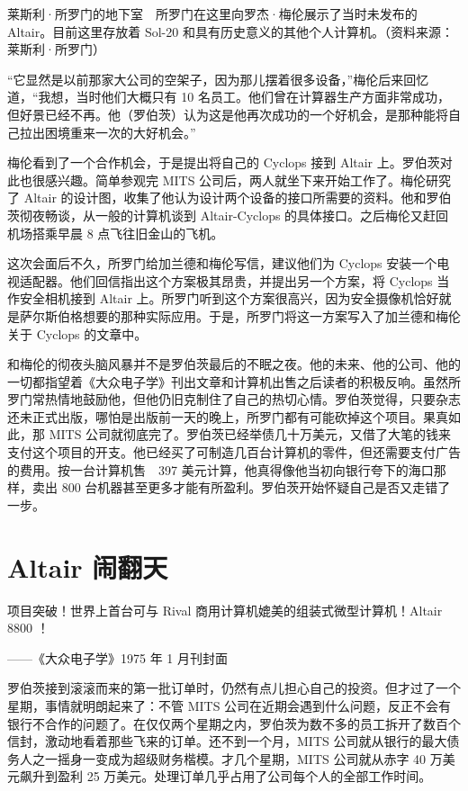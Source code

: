 \documentclass[12pt,UTF8]{ctexbook}
\begin{document}
莱斯利·所罗门的地下室　所罗门在这里向罗杰·梅伦展示了当时未发布的 Altair。目前这里存放着 Sol-20 和具有历史意义的其他个人计算机。（资料来源：莱斯利·所罗门）

“它显然是以前那家大公司的空架子，因为那儿摆着很多设备，”梅伦后来回忆道，“我想，当时他们大概只有 10 名员工。他们曾在计算器生产方面非常成功，但好景已经不再。他（罗伯茨）认为这是他再次成功的一个好机会，是那种能将自己拉出困境重来一次的大好机会。”

梅伦看到了一个合作机会，于是提出将自己的 Cyclops 接到 Altair 上。罗伯茨对此也很感兴趣。简单参观完 MITS 公司后，两人就坐下来开始工作了。梅伦研究了 Altair 的设计图，收集了他认为设计两个设备的接口所需要的资料。他和罗伯茨彻夜畅谈，从一般的计算机谈到 Altair-Cyclops 的具体接口。之后梅伦又赶回机场搭乘早晨 8 点飞往旧金山的飞机。

这次会面后不久，所罗门给加兰德和梅伦写信，建议他们为 Cyclops 安装一个电视适配器。他们回信指出这个方案极其昂贵，并提出另一个方案，将 Cyclops 当作安全相机接到 Altair 上。所罗门听到这个方案很高兴，因为安全摄像机恰好就是萨尔斯伯格想要的那种实际应用。于是，所罗门将这一方案写入了加兰德和梅伦关于 Cyclops 的文章中。

和梅伦的彻夜头脑风暴并不是罗伯茨最后的不眠之夜。他的未来、他的公司、他的一切都指望着《大众电子学》刊出文章和计算机出售之后读者的积极反响。虽然所罗门常热情地鼓励他，但他仍旧克制住了自己的热切心情。罗伯茨觉得，只要杂志还未正式出版，哪怕是出版前一天的晚上，所罗门都有可能砍掉这个项目。果真如此，那 MITS 公司就彻底完了。罗伯茨已经举债几十万美元，又借了大笔的钱来支付这个项目的开支。他已经买了可制造几百台计算机的零件，但还需要支付广告的费用。按一台计算机售　397 美元计算，他真得像他当初向银行夸下的海口那样，卖出 800 台机器甚至更多才能有所盈利。罗伯茨开始怀疑自己是否又走错了一步。





\section{Altair 闹翻天}


项目突破！世界上首台可与 Rival 商用计算机媲美的组装式微型计算机！Altair 8800 ！

——《大众电子学》1975 年 1 月刊封面



罗伯茨接到滚滚而来的第一批订单时，仍然有点儿担心自己的投资。但才过了一个星期，事情就明朗起来了：不管 MITS 公司在近期会遇到什么问题，反正不会有银行不合作的问题了。在仅仅两个星期之内，罗伯茨为数不多的员工拆开了数百个信封，激动地看着那些飞来的订单。还不到一个月，MITS 公司就从银行的最大债务人之一摇身一变成为超级财务楷模。才几个星期，MITS 公司就从赤字 40 万美元飙升到盈利 25 万美元。处理订单几乎占用了公司每个人的全部工作时间。
\end{document}
